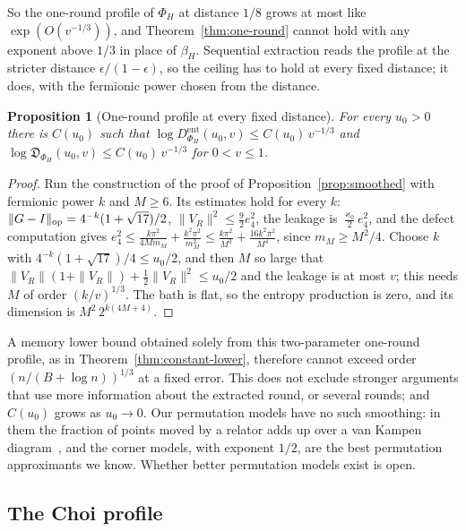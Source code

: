\documentclass[11pt,a4paper]{article}
\theoremstyle{plain}
\newtheorem{proposition}[theorem]{Proposition}
\theoremstyle{definition}
\theoremstyle{remark}
\newcommand{\Dsupp}{\mathfrak{D}}
\begin{document}
So the one-round profile of $\Phi_H$ at distance $1/8$ grows at most like $\exp(O(v^{-1/3}))$, and Theorem~\ref{thm:one-round} cannot hold with any
exponent above $1/3$ in place of $\beta_H$. Sequential extraction reads the profile at the stricter distance $\epsilon/(1-\epsilon)$, so the ceiling
has to hold at every fixed distance; it does, with the fermionic power chosen from the distance.

\begin{proposition}[One-round profile at every fixed distance]\label{prop:smoothed-u0}
For every $u_0>0$ there is $C(u_0)$ such that $\log D^{\mathrm{ent}}_{\Phi_H}(u_0,v)\le C(u_0)\,v^{-1/3}$ and
$\log\Dsupp_{\Phi_H}(u_0,v)\le C(u_0)\,v^{-1/3}$ for $0<v\le1$.
\end{proposition}

\begin{proof}
Run the construction of the proof of Proposition~\ref{prop:smoothed} with fermionic power $k$ and $M\ge6$. Its estimates hold for every $k$:
$\|G-I\|_{\rm op}=4^{-k}(1+\sqrt{17})/2$, $\|V_R\|^2\le\frac92e_4^2$, the leakage is $\frac{\varkappa_0}2e_4^2$, and the defect computation gives
$e_4^2\le\frac{k\pi^2}{4Mm_M}+\frac{k^2\pi^2}{m_M^2}\le\frac{k\pi^2}{M^3}+\frac{16k^2\pi^2}{M^4}$, since $m_M\ge M^2/4$. Choose $k$ with
$4^{-k}(1+\sqrt{17})/4\le u_0/2$, and then $M$ so large that $\|V_R\|(1+\|V_R\|)+\frac12\|V_R\|^2\le u_0/2$ and the leakage is at most $v$; this needs
$M$ of order $(k/v)^{1/3}$. The bath is flat, so the entropy production is zero, and its dimension is $M^2\,2^{k(4M+4)}$.
\end{proof}

A memory lower bound obtained solely from this two-parameter one-round profile, as in Theorem~\ref{thm:constant-lower}, therefore cannot
exceed order $(n/(B+\log n))^{1/3}$ at a fixed error. This does not exclude stronger arguments that use more information about the extracted
round, or several rounds; and $C(u_0)$ grows as $u_0\to0$. Our permutation models have no such smoothing: in them the
fraction of points moved by a relator adds up over a van Kampen diagram~\cite{DouglasMghirbiA}, and the corner models, with exponent $1/2$, are
the best permutation approximants we know. Whether better permutation models exist is open.


\subsection{The Choi profile}\label{sec:choi}
\end{document}
